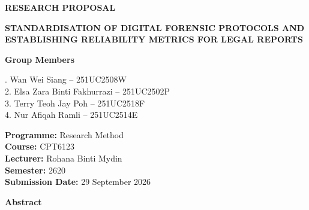\documentclass[a4paper]{report}
\begin{document}
\begin{center}

{\fontsize{18}{22}\selectfont\textbf{RESEARCH PROPOSAL}}

\vspace{1cm}

{\fontsize{18}{22}\selectfont\textbf{STANDARDISATION OF DIGITAL FORENSIC PROTOCOLS AND \\[6pt] ESTABLISHING RELIABILITY METRICS FOR LEGAL REPORTS \\[6pt]}}

\vspace{1cm}

{\fontsize{12}{14}\selectfont\textbf{Group Members}}

\vspace{0.3cm}

{\fontsize{12}{14}. Wan Wei Siang -- 251UC2508W\\
2. Elsa Zara Binti Fakhurrazi -- 251UC2502P\\
3. Terry Teoh Jay Poh -- 251UC2518F\\
4. Nur Afiqah Ramli -- 251UC2514E
}

\vspace{0.8cm}

{\fontsize{12}{14}\selectfont
\textbf{Programme:} Research Method\\
\textbf{Course:} CPT6123\\
\textbf{Lecturer:} Rohana Binti Mydin\\
\textbf{Semester:} 2620\\
\textbf{Submission Date:} 29 September 2026
}

\end{center}


\vspace{0.5cm}

\noindent
\textbf{Abstract}

\vspace{0.2cm}
\end{document}
